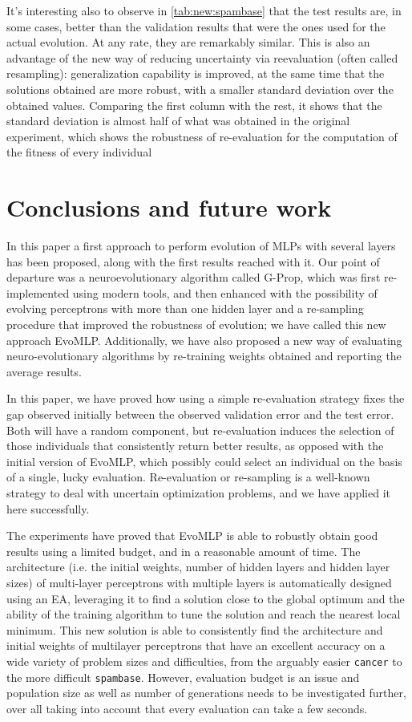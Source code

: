 \documentclass[conference]{IEEEtran}\usepackage[]{graphicx}\usepackage[]{color}
\begin{document}
It's interesting also to observe in \autoref{tab:new:spambase} that the test results are, in some cases, better than the validation results that were the ones used for the actual evolution. At any rate, they are remarkably similar. This is also an advantage of the new way of reducing uncertainty via reevaluation (often called resampling): generalization capability is improved, at the same time that the solutions obtained are more robust, with a smaller standard deviation over the obtained values. Comparing the first column with the rest, it shows that the standard deviation is almost half of what was obtained in the original experiment, which shows the robustness of re-evaluation for the computation of the fitness of every individual

\section{Conclusions and future work}
\label{sec:conclus}

In this paper a first approach to perform evolution of MLPs with
several layers has been proposed, along with the first results reached
with it. Our point of departure was a neuroevolutionary algorithm called G-Prop, which was first re-implemented using modern tools, and then enhanced with the possibility of evolving perceptrons with more than one hidden layer and a re-sampling procedure that improved the robustness of evolution; we have called this new approach EvoMLP. Additionally, we have also proposed a new way of evaluating neuro-evolutionary algorithms by re-training weights obtained and reporting the average results.

In this paper, we have proved how using a simple re-evaluation strategy fixes the gap observed initially between the observed validation error and the test error. Both will have a random component, but re-evaluation induces the selection of those individuals that consistently return better results, as opposed with the initial version of EvoMLP, which possibly could select an individual on the basis of a single, lucky evaluation. Re-evaluation or re-sampling is a well-known strategy to deal with uncertain optimization problems, and we have applied it here successfully.

The experiments have proved that EvoMLP is able to robustly obtain good results using a limited budget, and in a reasonable amount of time. The architecture (i.e. the initial weights, number of
hidden layers and hidden layer sizes) of multi-layer perceptrons with
multiple layers is automatically designed using an EA, leveraging it to find a solution close to the global optimum and
the ability of the training algorithm to tune the solution and reach
the nearest local minimum. This new solution is able to consistently find the architecture and initial weights of multilayer perceptrons that have an excellent accuracy on a wide variety of problem sizes and difficulties, from the arguably easier {\tt cancer} to the more difficult {\tt spambase}. However, evaluation budget is an issue and population size as well as number of generations needs to be investigated further, over all taking into account that every evaluation can take a few seconds.
\end{document}
